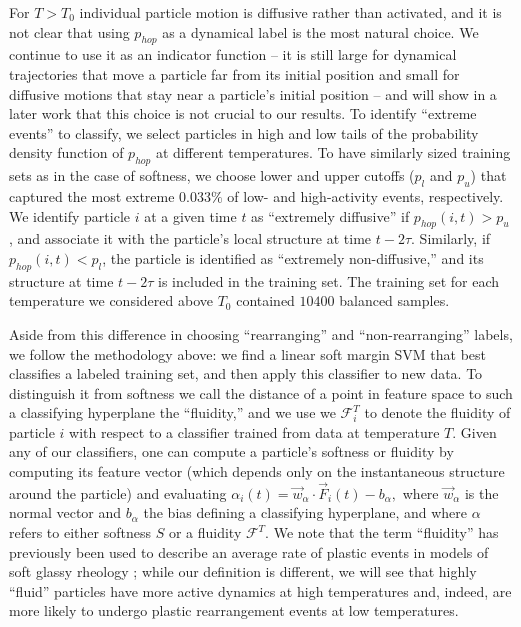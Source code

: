 \documentclass[aps,reprint,superscriptaddress,nofootinbib, notitlepage,prl]{revtex4-2}
\begin{document}
For $T>T_0$ individual particle motion is diffusive rather than activated, and it is not clear that using $p_{hop}$ as a dynamical label is the most natural choice. We continue to use it as an indicator function -- it is still large for dynamical trajectories that move a particle far from its initial position and small for diffusive motions that stay near a particle's initial position -- and will show in a later work that this choice is not crucial to our results. To identify ``extreme events'' to classify, we select particles in high and low tails of the probability density function of $p_{hop}$ at different temperatures. To have similarly sized training sets as in the case of softness, we choose lower and upper cutoffs ($p_l$ and $p_u$) that captured the most extreme $0.033\%$ of low- and high-activity events, respectively. We identify particle $i$ at a given time $t$ as ``extremely diffusive'' if $p_{hop}(i,t) > p_u$, and associate it with the particle's local structure at time $t - 2\tau$. Similarly, if  $p_{hop}(i,t) < p_l$, the particle is  identified as  ``extremely non-diffusive,'' and its structure at time $t - 2\tau$ is included in the training set. The training set for each temperature we considered above $T_0$ contained $10400$ balanced samples. 

Aside from this difference in choosing ``rearranging'' and ``non-rearranging'' labels, we follow the methodology above: we find a linear soft margin SVM that best classifies a labeled training set, and then apply this classifier to new data. To distinguish it from softness we call the distance of a point in feature space to such a classifying hyperplane the ``fluidity,'' and we use we $\mathcal{F}^{T}_i$ to denote the fluidity of particle $i$ with respect to a classifier trained from data at temperature $T$. Given any of our classifiers, one can compute a particle's softness or fluidity by computing its feature vector (which depends only on the instantaneous structure around the particle) and evaluating $\alpha_i(t) = \vec{w}_\alpha\cdot \vec{F}_i(t) -b_\alpha,$ where $\vec{w}_\alpha$ is the normal vector and $b_\alpha$ the bias defining a classifying hyperplane, and where $\alpha$ refers to either softness $S$ or a fluidity $\mathcal{F}^T$. We note that the term ``fluidity'' has previously been used to describe an average rate of plastic events in models of soft glassy rheology  \cite{bocquet2009kinetic}; while our definition is different, we will see that highly ``fluid'' particles have more active dynamics at high temperatures and, indeed, are more likely to undergo plastic rearrangement events at low temperatures. 
\end{document}
